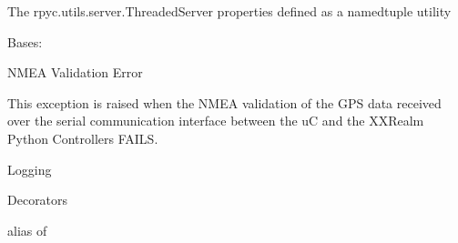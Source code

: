 \documentclass[letterpaper,10pt,english]{sphinxmanual}
\begin{document}

\begin{fulllineitems}
\label{\detokenize{Forge:Forge.LOGGING_DATE_TIME_FORMAT}}
\sphinxAtStartPar
The rpyc.utils.server.ThreadedServer properties defined as a namedtuple utility

\end{fulllineitems}


\begin{fulllineitems}
\label{\detokenize{Forge:Forge.NMEAValidationError}}
\sphinxAtStartPar
Bases: 

\sphinxAtStartPar
NMEA Validation Error

\sphinxAtStartPar
This exception is raised when the NMEA validation of the GPS data received over the serial communication
interface between the uC and the XXRealm Python Controllers FAILS.

\end{fulllineitems}


\begin{fulllineitems}
\label{\detokenize{Forge:Forge.REALMS_PORT_ENVIRONMENT_VARIABLE}}
\sphinxAtStartPar
Logging

\end{fulllineitems}


\begin{fulllineitems}
\label{\detokenize{Forge:Forge.REALMS_THREADED_SERVER_DETAILS}}
\sphinxAtStartPar
Decorators

\sphinxAtStartPar
alias of 

\end{fulllineitems}
\end{document}
